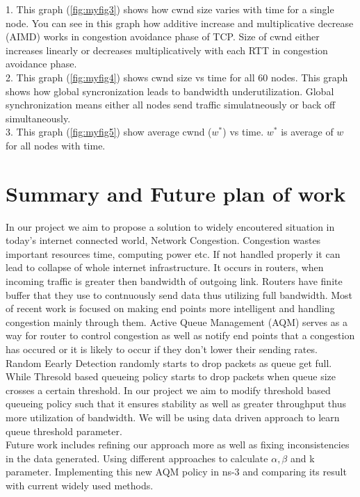 1. This graph (\ref{fig:myfig3}) shows how cwnd size varies with time for a single node. You can see in this graph how additive increase and multiplicative decrease (AIMD) works in congestion avoidance phase of TCP. Size of cwnd either increases linearly or decreases multiplicatively with each RTT in congestion avoidance phase.\\ %
2. This graph (\ref{fig:myfig4}) shows cwnd size vs time for all 60 nodes. This graph shows how global syncronization leads to bandwidth underutilization. Global synchronization means either all nodes send traffic simulatneously or back off simultaneously. \\ %
3. This graph (\ref{fig:myfig5}) show average cwnd ($ w^* $) vs time. $ w^* $ is average of $ w $ for all nodes with time. \\ %

\clearpage
\section{Summary and Future plan of work}
In our project we aim to propose a solution to widely encoutered situation in today's internet connected world, Network Congestion. Congestion wastes important resources time, computing power etc. If not handled properly it can lead to collapse of whole internet infrastructure. It occurs in routers, when incoming traffic is greater then bandwidth of outgoing link. Routers have finite buffer that they use to contnuously send data thus utilizing full bandwidth. Most of recent work is focused on making end points more intelligent and handling congestion mainly through them. Active Queue Management (AQM) serves as a way for router to control congestion as well as notify end points that a congestion has occured or it is likely to occur if they don't lower their sending rates. Random Eearly Detection randomly starts to drop packets as queue get full. While Thresold based queueing policy starts to drop packets when queue size crosses a certain threshold. In our project we aim to modify threshold based queueing policy such that it ensures stability as well as greater throughput thus more utilization of bandwidth. We will be using data driven approach to learn queue threshold parameter.\\
Future work includes refining our approach more as well as fixing inconsistencies in the data generated. Using different approaches to calculate \( \alpha, \beta \) and k parameter. Implementing this new AQM policy in ns-3 and comparing its result with current widely used methods.\\


\clearpage


